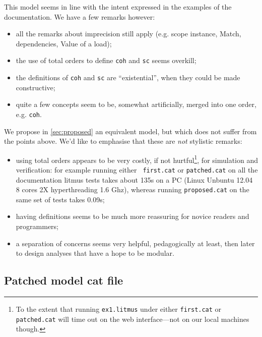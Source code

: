 \documentclass[a4paper]{article}
\begin{document}
This model seems in line with the intent expressed in the examples of the
documentation. We have a few remarks however:
\begin{itemize}
\item all the remarks about imprecision still apply (e.g. scope instance,
Match, dependencies, Value of a load);
\item the use of total orders to define {\tt coh} and {\tt sc} seems overkill;
\item the definitions of {\tt coh} and {\tt sc} are ``existential'', when they could be
made constructive;
\item quite a few concepts seem to be, somewhat artificially, merged into one
order, e.g. {\tt coh}.
\end{itemize}

We propose in \mysec\ref{sec:proposed} an equivalent model, but which does not
suffer from the points above. We'd like to emphasise that these are \emph{not}
stylistic remarks: 
\begin{itemize}
\item using total orders appears to be very costly, if not hurtful\footnote{To
the extent that running {\tt ex1.litmus} under either {\tt first.cat} or {\tt
patched.cat} will time out on the web interface---not on our local machines
though.}, for simulation and verification: for example running either {\tt
first.cat} or {\tt patched.cat} on all the documentation litmus tests takes
about 135s on a PC (Linux Unbuntu 12.04 8 cores 2X hyperthreading 1.6 Ghz),
whereas running {\tt proposed.cat} on the same set of tests takes 0.09s;
\item having definitions seems to be much more reassuring for
novice readers and programmers; 
\item a separation of concerns seems very helpful, pedagogically at least, then
later to design analyses that have a hope to be modular.
\end{itemize}

\clearpage

\subsection{Patched model cat file}
\end{document}
